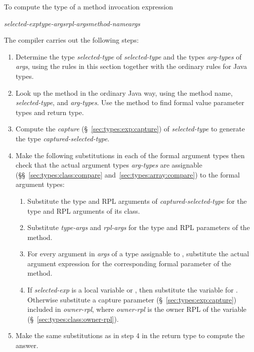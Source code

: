   To compute the type of a
method invocation expression
%
\begin{description}
\item \emph{selected-exp}\emph{type-args}\kwd{,}\emph{rpl-args}\kwd{>}\emph{method-name}\kwd{(}\emph{args}\kwd{)}
\end{description}
%
The compiler carries out the following steps:
%
\begin{enumerate}
%
\item Determine the type \emph{selected-type} of \emph{selected-type}
  and the types \emph{arg-types} of \emph{args}, using the rules in
  this section together with the ordinary rules for Java types.
%
\item Look up the method in the ordinary Java way, using the method
  name, \emph{selected-type}, and \emph{arg-types}.  Use the method to
  find formal value parameter types and return type.
%
\item Compute the \emph{capture} (\S~\ref{sec:types:exp:capture}) of
  \emph{selected-type} to generate the type
  \emph{captured-selected-type}.
%
\item Make the following substitutions in each of the formal argument
  types then check that the actual argument types \emph{arg-types} are
  assignable (\S\S~\ref{sec:types:class:compare}
  and~\ref{sec:types:array:compare}) to the formal argument types:
%
\begin{enumerate}
%
\item Substitute the type and RPL arguments of
  \emph{captured-selected-type} for the type and RPL arguments of its
  class.
\item Substitute \emph{type-args} and \emph{rpl-args} for the type and
  RPL parameters of the method.
\item For every argument in \emph{args} of a type assignable to
  , substitute the actual argument expression for the
  corresponding formal parameter of the method.
\item If \emph{selected-exp} is a  local variable or
  , then substitute the variable for .  Otherwise
  substitute a capture parameter (\S~\ref{sec:types:exp:capture})
  included in \emph{owner-rpl}\kwd{:*}, where \emph{owner-rpl} is the
  owner RPL of the variable (\S~\ref{sec:types:class:owner-rpl}).
%
\end{enumerate}
%
\item Make the same substitutions as in step 4 in the return type to
  compute the answer.
%
\end{enumerate}

